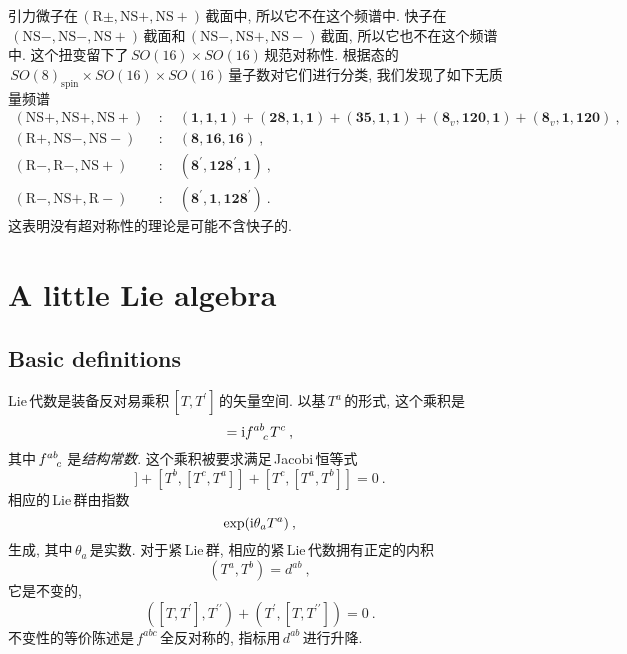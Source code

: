 引力微子在$\,(\mathrm{R}\pm,\mathrm{NS}+,\mathrm{NS}+)\,$截面中, 所以它不在这个频谱中. 快子在$\,(\mathrm{NS}-,\mathrm{NS}-,\mathrm{NS}+)\,$截面和$\,(\mathrm{NS}-,\mathrm{NS}+,\mathrm{NS}-)\,$截面, 所以它也不在这个频谱中. 这个扭变留下了$\,SO(16)\times SO(16)\,$规范对称性. 根据态的$\,SO(8)_{\text{spin}}\times SO(16)\times SO(16)\,$量子数对它们进行分类, 我们发现了如下无质量频谱
\begin{align*}
    (\mathrm{NS}+,\mathrm{NS}+,\mathrm{NS}+)&\::\quad (\mathbf{1},\mathbf{1},\mathbf{1}) 
    + (\mathbf{28},\mathbf{1},\mathbf{1}) + (\mathbf{35},\mathbf{1},\mathbf{1})
    + (\mathbf{8}_{v},\mathbf{120},\mathbf{1}) + (\mathbf{8}_{v},\mathbf{1},\mathbf{120}) \:, \\
    (\mathrm{R}+,\mathrm{NS}-,\mathrm{NS}-)&\::\quad (\mathbf{8},\mathbf{16},\mathbf{16})\: , \\
    (\mathrm{R}-,\mathrm{R}-,\mathrm{NS}+)&\::\quad  (\mathbf{8}^{\prime},\mathbf{128}^{\prime},\mathbf{1})\:, \\
    (\mathrm{R}-,\mathrm{NS}+,\mathrm{R}-)&\::\quad (\mathbf{8}^{\prime},\mathbf{1},\mathbf{128}^{\prime})\:.
\end{align*}
这表明没有超对称性的理论是可能不含快子的.


\section{A little Lie algebra}

\subsection*{Basic definitions}

Lie\,代数是装备反对易乘积$\,[T,T^{\prime}]\,$的矢量空间. 以基$\,T^{a}\,$的形式, 这个乘积是
\begin{equation}
    [T^{a},T^{b}] = \mi f\indices{^a^b_c}T^{c} \:, \label{11.4.1}
\end{equation}
其中$\,f\indices{^a^b_c}\,$是{\emph{结构常数}}. 这个乘积被要求满足\,Jacobi\,恒等式
\begin{equation}
    [T^{a},[T^{b},T^{c}]] + [T^{b},[T^{c},T^{a}]] + [T^{c},[T^{a},T^{b}]] =0 \:.\label{11.4.2}
\end{equation}
相应的\,Lie\,群由指数
\begin{equation}
    \exp(\mathrm{i}\theta_{a}T^{a}) \:, \label{11.4.3}
\end{equation}
生成, 其中$\,\theta_{a}\,$是实数. 对于紧\,Lie\,群, 相应的紧\,Lie\,代数拥有正定的内积
\begin{equation}
    (T^{a},T^{b}) = d^{ab} \:, \label{11.4.4}
\end{equation}
它是不变的,
\begin{equation}
    ([T,T^{\prime}],T^{\prime\prime}) + (T^{\prime},[T,T^{\prime\prime}]) =0\:. \label{11.4.5}
\end{equation}
不变性的等价陈述是$\,f^{abc}\,$全反对称的, 指标用$\,d^{ab}\,$进行升降.

